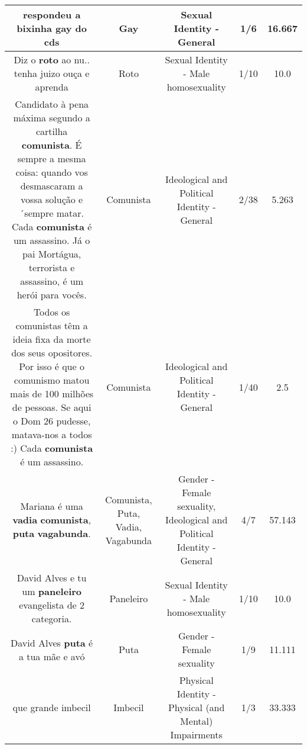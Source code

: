 \documentclass[11pt]{article}
\newlength\mylength
\begin{document}
\begin{center}
\begin{longtable}{|C{.65\mylength}|C{.30\mylength}|C{.12\mylength}|C{.12\mylength}|C{.12\mylength}|}
  \small respondeu a bixinha \textbf{gay} do cds\normalsize   & Gay & Sexual Identity - General & 1/6 & 16.667 \\  \hline
  \small Diz o \textbf{roto} ao nu.. tenha juizo ouça e aprenda\normalsize   & Roto & Sexual Identity - Male homosexuality & 1/10 & 10.0 \\  \hline
  \small Candidato à pena máxima segundo a cartilha \textbf{comunista}. É sempre a mesma coisa: quando vos desmascaram a vossa solução e´sempre matar. Cada \textbf{comunista} é um assassino. Já o pai Mortágua, terrorista e assassino, é um herói para vocês.\normalsize   & Comunista & Ideological and Political Identity - General & 2/38 & 5.263 \\  \hline
  \small Todos os comunistas têm a ideia fixa da morte dos seus opositores. Por isso é que o comunismo matou mais de 100 milhões de pessoas. Se aqui o Dom 26 pudesse, matava-nos a todos :) Cada \textbf{comunista} é um assassino.\normalsize   & Comunista & Ideological and Political Identity - General & 1/40 & 2.5 \\  \hline
  \small Mariana é uma \textbf{vadia} \textbf{comunista}, \textbf{puta} \textbf{vagabunda}.\normalsize   & Comunista, Puta, Vadia, Vagabunda & Gender - Female sexuality, Ideological and Political Identity - General & 4/7 & 57.143 \\  \hline
  \small David Alves e tu um \textbf{paneleiro} evangelista de 2 categoria.\normalsize   & Paneleiro & Sexual Identity - Male homosexuality & 1/10 & 10.0 \\  \hline
  \small David Alves \textbf{puta} é a tua mãe e avó\normalsize   & Puta & Gender - Female sexuality & 1/9 & 11.111 \\  \hline
  \small que grande imbecil\normalsize   & Imbecil & Physical Identity - Physical (and Mental) Impairments & 1/3 & 33.333 \\  \hline

\end{longtable}
\end{center}
\end{document}
